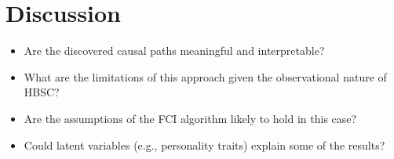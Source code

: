 \documentclass[main.tex]{subfiles}
\begin{document}
\section{Discussion}

\begin{itemize}
    \item Are the discovered causal paths meaningful and interpretable?
    \item What are the limitations of this approach given the observational nature of HBSC?
    \item Are the assumptions of the FCI algorithm likely to hold in this case?
    \item Could latent variables (e.g., personality traits) explain some of the results?
\end{itemize}
\end{document}
